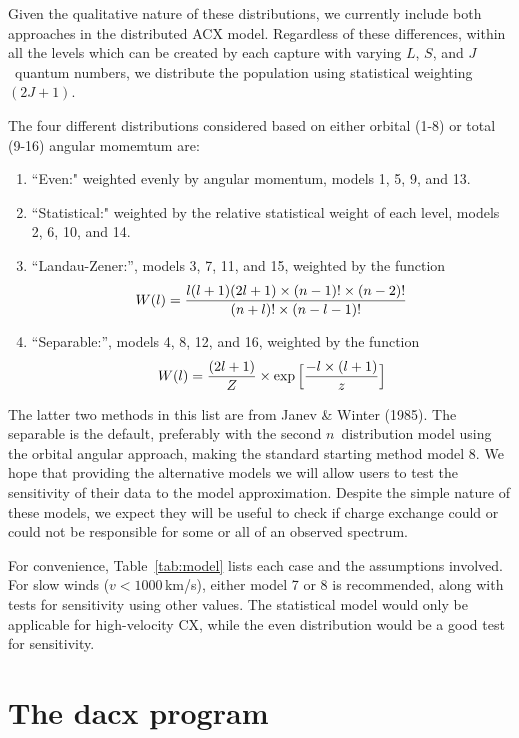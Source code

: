 \documentclass[11pt]{article}
\begin{document}
Given the qualitative nature of these distributions, we currently
include both approaches in the distributed ACX model. Regardless of
these differences, within all the levels which can be created by each
capture with varying $L$, $S$, and $J$\ quantum numbers, we distribute
the population using statistical weighting $(2J+1)$.

The four different distributions considered based on either orbital
(1-8) or total (9-16) angular momemtum are:
\begin{enumerate}
\item ``Even:" weighted evenly by angular momentum, models 1,
  5, 9, and 13.
\item ``Statistical:" weighted by the relative statistical weight of
  each level, models 2, 6, 10, and 14.
\item ``Landau-Zener:'', models 3, 7, 11, and 15, weighted by the function 
\begin{equation}
W(l)={{l(l+1)(2l+1)\times(n-1)! \times (n-2)!}\over{ (n+l)! \times (n-l-1)!}}
\end{equation}
\item ``Separable:'', models 4, 8, 12, and 16, weighted by the function 
\begin{equation}
W(l) = {{(2l+1)}\over{Z}}\times \exp\Big[{{-l \times(l+1)}\over{z}}\Big]
\end{equation}
\end{enumerate}

The latter two methods in this list are from Janev \& Winter
(1985). The separable is the default, preferably with the second
$n$\ distribution model using the orbital angular approach, making the
standard starting method model 8.  We hope that providing the
alternative models we will allow users to test the sensitivity of
their data to the model approximation. Despite the simple nature of
these models, we expect they will be useful to check if charge
exchange could or could not be responsible for some or all of an
observed spectrum.

For convenience, Table~\ref{tab:model} lists each case and the
assumptions involved.  For slow winds ($v < 1000$\,km/s), either model
7 or 8 is recommended, along with tests for sensitivity using other
values.  The statistical model would only be applicable for
high-velocity CX, while the even distribution would be a good test for
sensitivity. 

\section*{The dacx program}
\end{document}
